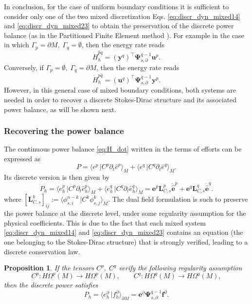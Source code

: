 \documentclass{elsarticle}
\newtheorem{proposition}{Proposition}
\newcommand*{\dual}[1]{\ensuremath{\widehat{#1}}}
\newcommand{\dualpr}[3][]{\ensuremath{\langle #2 \, \vert #3 \rangle_{#1}}}
\begin{document}
In conclusion, for the case of uniform boundary conditions it is sufficient to consider only one of the two mixed discretization Eqs. \eqref{eq:discr_dyn_mixed14} and \eqref{eq:discr_dyn_mixed23} to obtain the preservation of the discrete power balance (as in the Partitioned Finite Element method \cite{cardoso2020pfem}). For example in the case in which $\Gamma_p =\partial M, \; \Gamma_q = \emptyset$, then the energy rate reads
\begin{equation}
    \dot{H}_h^{\dual{p}q}= (\mathbf{y}^q)^\top\mathbf{\Psi}^{q-1}_{s, \partial} \mathbf{u}^p.
\end{equation}
Conversely, if $\Gamma_p =\emptyset, \; \Gamma_q = \partial M$, then the energy rate reads
\begin{equation}
    \dot{H}_h^{p\dual{q}} = (\mathbf{u}^q)^\top\mathbf{\Psi}^{q-1}_{s, \partial} \mathbf{y}^p.
\end{equation}
However, in this general case of mixed boundary conditions, both systems are needed in order to recover a discrete Stokes-Dirac structure and its associated power balance, as will be shown next.


\subsubsection{Recovering the power balance}
The continuous power balance \eqref{eq:H_dot} written in the terms of efforts can be expressed as
\begin{equation}
    P = \dualpr[M]{e^p}{C^p\partial_t \dual{e}^p} + \dualpr[M]{e^q}{C^q\partial_t \dual{e}^q}.
\end{equation}
Its discrete version is then given by 
\begin{equation}
    P_h = \dualpr[M]{e^p_h}{C^p\partial_t \dual{e}^p_h} + \dualpr[M]{e^q_h}{C^q\partial_t \dual{e}^q_h} = \mathbf{e}^p \mathbf{L}_{C,s}^p \dot{\dual{\mathbf{e}}}^p + \mathbf{e}^q \mathbf{L}_{C,s}^q \dot{\dual{\mathbf{e}}}^q.
\end{equation}
where $[\mathbf{L}_{C, s}^k]_{ij} := \dualpr[M]{\phi^{n-k}_{s, i}}{C^k \phi^k_{s, j}}$. The dual field formulation is such to preserve the power balance at the discrete level, under some regularity assumption for the physical coefficients. This is due to the fact that each mixed system \eqref{eq:discr_dyn_mixed14} and \eqref{eq:discr_dyn_mixed23} contains an equation (the one belonging to the Stokes-Dirac structure) that is strongly verified, leading to a discrete conservation law.

\begin{proposition}\label{pr:discr_Hdot}
If the tensors $C^p, \; C^q$ verify the following regularity assumption
\begin{equation}\label{eq:reg_C}
    C^p: H\Omega^p(M) \rightarrow H\Omega^p(M), \qquad C^q: H\Omega^q(M) \rightarrow H\Omega^q(M),
\end{equation}
then the discrete power satisfies
\begin{equation}
    P_h = \dualpr[\partial M]{e^\partial_h}{f^\partial_h} = \mathbf{e}^\partial \mathbf{\Psi}^{q-1}_{s, \partial} \mathbf{f}^\partial.
\end{equation}
\end{proposition}
\end{document}
